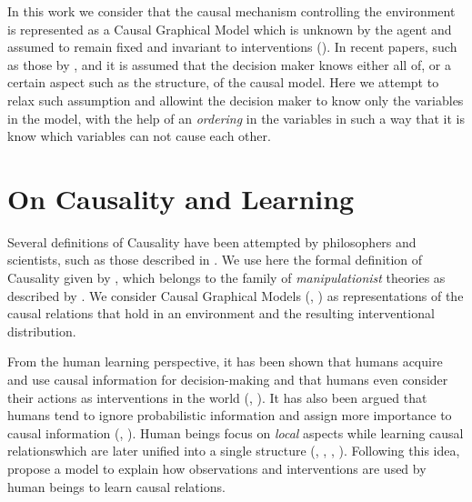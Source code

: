 \documentclass[letterpaper]{article}
\begin{document}
In this work we consider that the causal mechanism controlling the environment is represented as a Causal Graphical Model which is unknown by the agent and assumed to remain fixed and invariant to interventions (\cite{woodward2005making}). In recent papers, such as those by \cite{lattimoreNIPS2016}, \cite{sen2017identifying} and \cite{gonzalez2018playing} it is assumed that the decision maker knows either all of, or a certain aspect such as the structure, of the causal model. Here we attempt to relax such assumption and allowint the decision maker to know only the variables in the model, with the help of an \textit{ordering} in the variables in such a way that it is know which variables can not cause each other. 

\section{On Causality and Learning}
Several definitions of Causality have been attempted by philosophers and scientists, such as those described in \cite{holland1986statistics}. We use here the formal definition of Causality given by \cite{spirtes2000causation}, which belongs to the family of \textit{manipulationist} theories as described by \cite{woodward2005making}. We consider Causal Graphical Models (\cite{koller2009probabilistic}, \cite{sucar2015probabilistic}) as representations of the causal relations that hold in an environment and the resulting interventional distribution.

From the human learning perspective, it has been shown that humans acquire and use causal information for decision-making and that humans even consider their actions as interventions in the world (\cite{hagmayer2009decision}, \cite{wellen2012learning} \cite{hagmayer2013repeated}). It has also been argued that humans tend to ignore probabilistic information and assign more importance to causal information (\cite{tversky1980causal}, \cite{pearl2009causality}). Human beings focus on \textit{local} aspects while learning causal relationswhich are later unified into a single structure (\cite{fernbach2009causal}, \cite{waldmann2008causal}, \cite{wellen2012learning}, \cite{danks2014unifying}). Following this idea, \cite{wellen2012learning} propose a model to explain how observations  and interventions are used by human beings to learn causal relations. 
\end{document}
